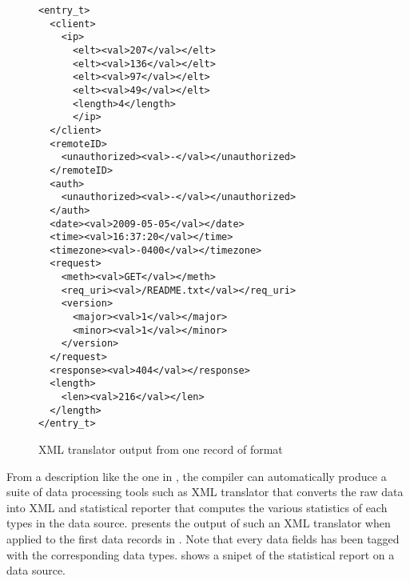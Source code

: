 \begin{figure}[th]
{\footnotesize
\begin{verbatim}
<entry_t>
  <client>
    <ip>
      <elt><val>207</val></elt>
      <elt><val>136</val></elt>
      <elt><val>97</val></elt>
      <elt><val>49</val></elt>
      <length>4</length>
      </ip>
  </client>
  <remoteID>
    <unauthorized><val>-</val></unauthorized>
  </remoteID>
  <auth>
    <unauthorized><val>-</val></unauthorized>
  </auth>
  <date><val>2009-05-05</val></date>
  <time><val>16:37:20</val></time>
  <timezone><val>-0400</val></timezone>
  <request>
    <meth><val>GET</val></meth>
    <req_uri><val>/README.txt</val></req_uri>
    <version>
      <major><val>1</val></major>
      <minor><val>1</val></minor>
    </version>
  </request>
  <response><val>404</val></response>
  <length>
    <len><val>216</val></len>
  </length>
</entry_t>
\end{verbatim}
}
\caption{XML translator output from one record of \ai{} format}\label{fig:xml}
\end{figure}

From a description like the one in , the \pads{}
compiler can automatically produce a suite of data processing tools
such as XML translator that converts the raw data into XML and
statistical reporter that computes the various statistics of each types
in the data source.  presents the output of such an XML
translator when applied to the first data records in .
Note that every data fields has been tagged with the corresponding 
\pads{} data types.  shows a snipet of the statistical
report on a \ai{} data source. 


